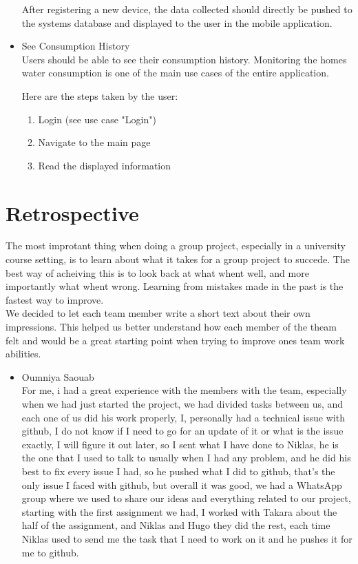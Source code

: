 \documentclass[10pt]{article}
\begin{document}
\begin{multicols*}{2}
\begin{itemize}
  After registering a new device, the data collected should directly be pushed to the systems database and displayed to the user in the mobile application.

  \item {See Consumption History} \\
  Users should be able to see their consumption history. Monitoring the homes water consumption is one of the main use cases of the entire application.

  Here are the steps taken by the user:
  \begin{enumerate}
    \item Login (see use case "Login")
    \item Navigate to the main page
    \item Read the displayed information
  \end{enumerate}

\end{itemize}

\clearpage 

\section{Retrospective}


The most improtant thing when doing a group project, especially in a university course setting, is to learn about what it takes for a group project to succede.
The best way of acheiving this is to look back at what whent well, and more importantly what whent wrong. Learning from mistakes made in the past is the fastest way to improve.\\

We decided to let each team member write a short text about their own impressions. This helped us better understand how each member of the theam felt and would be a great starting point when trying to improve ones team work abilities.

\begin{itemize}
  \item {Oumniya Saouab}\\
  For me, i had a great experience with the members with the team, especially when we had just started the project, we had divided tasks between us, and each one of us did his work properly, I, personally had a technical issue with github, I do not know if I need to go for an update of it or what is the issue exactly, I will figure it out later, so I sent what I have done to Niklas, he is the one that I used to talk to usually when I had any problem, and he did his best to fix every issue I had, so he pushed what I did to github, that’s the only issue I faced with github, but overall it was good, we had a WhatsApp group where we used to share our ideas and everything related to our project, starting with the first assignment we had, I worked with Takara about the half of the assignment, and Niklas and Hugo they did the rest, each time Niklas used to send me the task that I need to work on it and he pushes it for me to github. 
  

\end{itemize}
\end{multicols*}
\end{document}
